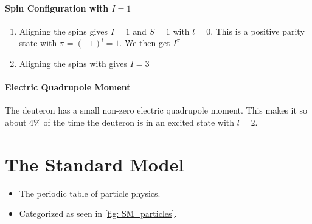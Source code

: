 \documentclass{article}
\begin{document}
\paragraph{Spin Configuration with $I = 1$}
\begin{enumerate}
    \item Aligning the spins gives $I = 1$ and $S = 1$ with $l = 0$. This is a positive parity state with $π = (-1)^{l} = 1$. We then get $I^{π}$ 
    \item Aligning the spins with gives $I = 3$
\end{enumerate}

\paragraph{Electric Quadrupole Moment}
The deuteron has a small non-zero electric quadrupole moment. This makes it so about 4\% of the time the deuteron is in an excited state with $l = 2$. \section{The Standard Model}
\begin{itemize}
    \item The periodic table of particle physics.
    \item Categorized as seen in \cref{fig: SM_particles}.
\end{itemize}
\end{document}
